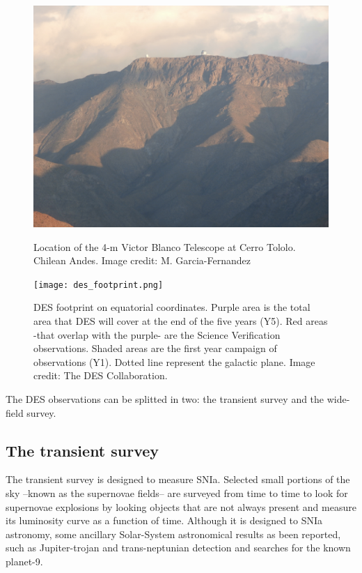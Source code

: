 \begin{figure}
\begin{center}
\includegraphics[width=\textwidth]{./Pictures/cerrotololo_mine.jpg}
\caption{Location of the 4-m Victor Blanco Telescope at Cerro Tololo. Chilean Andes. Image credit: M. Garcia-Fernandez}
\label{fig:cerrotololo}
\vspace{2cm}
\texttt{[image: des\_footprint.png]}
\caption{DES footprint on equatorial coordinates. Purple area is the total area that DES will cover at the end of the five years (Y5). Red areas -that overlap with the purple- are the Science Verification observations. Shaded areas are the first year campaign of observations (Y1). Dotted line represent the galactic plane. Image credit: The DES Collaboration.}
\label{fig:des_footprint}
\end{center}
\end{figure}

The DES observations can be splitted in two: the transient survey and the wide-field survey.

\subsection{The transient survey}
The transient survey is designed to measure SNIa. Selected small portions of the sky --known as the supernovae fields-- are surveyed from time to time to look for supernovae explosions by looking objects that are not always present and measure its luminosity curve as a function of time. Although it is designed to SNIa astronomy, some ancillary Solar-System astronomical results as been reported, such as Jupiter-trojan and trans-neptunian detection and searches for the known planet-9.

